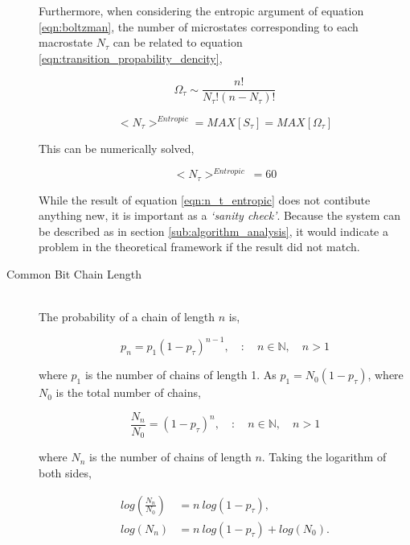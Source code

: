\begin{description}
					Furthermore, when considering the entropic argument of equation \ref{eqn:boltzman}, the number of microstates corresponding to each macrostate $N_\tau$ can be related to equation \ref{eqn:transition_propability_dencity},

					\begin{equation}
						\Omega_\tau \sim \frac{n!}{N_{\tau}!(n-N_{\tau})!}
					\end{equation}

					\begin{equation}
						<N_\tau>^{Entropic} = MAX[S_\tau] = MAX[\Omega_\tau]
					\end{equation}

					This can be numerically solved,

					\begin{equation}
						<N_\tau>^{Entropic}\ = 60
						\label{eqn:n_t_entropic}
					\end{equation}

					While the result of equation \ref{eqn:n_t_entropic} does not contibute anything new, it is important as a \textit{`sanity check'}.
					Because the system can be described as in section \ref{sub:algorithm_analysis}, it would indicate a problem in the theoretical framework if the result did not match.


				\item[Common Bit Chain Length] \hfill \\
					
					The probability of a chain of length $n$ is,

					\begin{equation}
						p_n = p_1(1 - p_\tau)^{n-1}, \quad : \quad n \in \mathbb{N}, \quad n > 1
					\end{equation}

					where $p_1$ is the number of chains of length 1. 
					As $p_1 = N_0 (1 -p_\tau)$, where $N_0$ is the total number of chains,

					\begin{equation}
						\frac{N_n}{N_0} = (1 - p_\tau)^n, \quad : \quad n \in \mathbb{N}, \quad n > 1
					\end{equation}

					where $N_n$ is the number of chains of length $n$.
					Taking the logarithm of both sides,

					\begin{align}
						log\left(\frac{N_n}{N_0}\right) &= n\ log(1 - p_\tau), \nonumber \\
 						log(N_n) &= n\  log(1 - p_\tau) + log(N_0).
 					\end{align}


\end{description}
